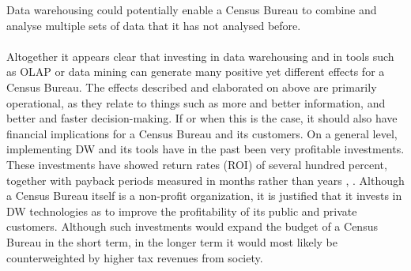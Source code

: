 Data warehousing could potentially enable a Census Bureau to combine and analyse multiple sets of data that it has not analysed before.
\\\\ 
Altogether it appears clear that investing in data warehousing and in tools such as OLAP or data mining can generate many positive yet 
different effects for a Census Bureau. 
The effects described and elaborated on above are primarily operational, as they relate to things such as more and better information,
and better and faster decision-making. 
If or when this is the case, it should also have financial implications for a Census Bureau and its customers.
On a general level, implementing DW and its tools have in the past been very profitable investments. 
These investments have showed return rates (ROI) of several hundred percent,
together with payback periods measured in months rather than years \cite[chapter~31.1.3]{CourseLitt}, \cite{l2video}. 
Although a Census Bureau itself is a non-profit organization, 
it is justified that it invests in DW technologies as to improve the profitability of its public and private customers. 
Although such investments would expand the budget of a Census Bureau in the short term, 
in the longer term it would most likely be counterweighted by higher tax revenues from society.